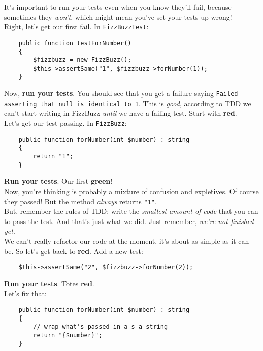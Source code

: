 It's important to run your tests even when you know they'll fail, because sometimes they \textit{won't}, which might mean you've set your tests up wrong!
\\

Right, let's get our first fail. In \texttt{FizzBuzzTest}:

\begin{verbatim}
    public function testForNumber()
    {
        $fizzbuzz = new FizzBuzz();
        $this->assertSame("1", $fizzbuzz->forNumber(1));
    }
\end{verbatim}

Now, \textbf{run your tests}. You should see that you get a failure saying \texttt{Failed asserting that null is identical to \textquotesingle{}1\textquotesingle{}}. This is \textit{good}, according to TDD we can't start writing in FizzBuzz \textit{until} we have a failing test. Start with \textbf{red}.
\\

Let's get our test passing. In \texttt{FizzBuzz}:

\begin{verbatim}
    public function forNumber(int $number) : string
    {
        return "1";
    }
\end{verbatim}

\textbf{Run your tests}. Our first \textbf{green}!
\\

Now, you're thinking is probably a mixture of confusion and expletives. Of course they passed! But the method \textit{always} returns \texttt{"1"}.
\\

But, remember the rules of TDD: write the \textit{smallest amount of code} that you can to pass the test. And that's just what we did. Just remember, \textit{we're not finished yet}.
\\

We can't really refactor our code at the moment, it's about as simple as it can be. So let's get back to \textbf{red}. Add a new test:

\begin{verbatim}
    $this->assertSame("2", $fizzbuzz->forNumber(2));
\end{verbatim}

\textbf{Run your tests}. Totes \textbf{red}.
\\

Let's fix that:

\begin{verbatim}
    public function forNumber(int $number) : string
    {
        // wrap what's passed in a s a string
        return "{$number}";
    }
\end{verbatim}

